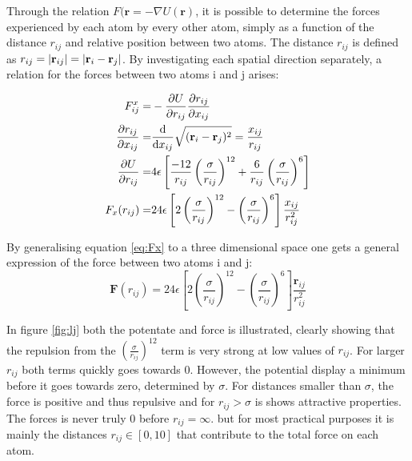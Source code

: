 Through the relation $ 	F (\textbf{r} = -\nabla U(\textbf{r}) $, it is possible to determine the forces experienced by each atom by every other atom, simply as a function of the distance $ r_{ij} $ and relative position between two atoms. The distance $ r_{ij} $ is defined as  $ r_{ij}  = \abs{\textbf{r}_{ij}} = \abs{\textbf{r}_i - \textbf{r}_j} 	 $. By investigating each spatial direction separately, a relation for the forces between two atoms i and j arises: 

\begin{align}
		F_{ij}^x =& - \pdv{U}{r_{ij}} \pdv{r_{ij}}{x_{ij}}	\\	
		\pdv{r_{ij}}{x_{ij}} 		=& 			 \dv{x_{ij}} \sqrt{ (\textbf{r}_i - \textbf{r}_j)^2}	= \frac{x_{ij}}{r_{ij}}\\
		 \pdv{U}{r_{ij}} =& 4\epsilon \left[\frac{-12}{r_{ij}}\left(	\frac{\sigma}{r_{ij}}\right)^{12}		+  \frac{6}{r_{ij}} \left(\frac{\sigma}{r_{ij}}	\right)^{6}				\right]\\
		 F_x(r_{ij}) =& 24 \epsilon \left[		2	\left(\frac{\sigma}{r_{ij}}	\right)^{12}		- \left(\frac{\sigma}{r_{ij}}	\right)^{6}				\right] \frac{x_{ij}}{r_{ij}^2} \label{eq:Fx}
\end{align}

By generalising equation \ref{eq:Fx} to a three dimensional space one gets a general expression of the force between two atoms i and j: 
\begin{equation}\label{eq:F}
		  \textbf{F}(r_{ij}) = 24 \epsilon \left[		2	\left(\frac{\sigma}{r_{ij}}	\right)^{12}		- \left(\frac{\sigma}{r_{ij}}	\right)^{6}				\right] \frac{\textbf{r}_{ij}}{r_{ij}^2}
\end{equation}

In figure \ref{fig:lj} both the potentate and force is illustrated, clearly showing that the repulsion from the $ \left(	\frac{\sigma}{r_{ij}}\right)^{12} $ term is very strong at low values of $ r_{ij}$. For larger $ r_{ij} $ both terms quickly goes towards 0. However, the potential display a minimum before it goes towards zero, determined by $ \sigma $. For distances smaller than $ \sigma $, the force is positive and thus repulsive and for $ r_{ij} >\sigma $ is shows attractive properties. The forces is never truly 0 before $ r_{ij}  = \infty$. but for most practical purposes it is mainly the distances $ r_{ij} \in [0,10] $ that contribute to the total force on each atom. 



